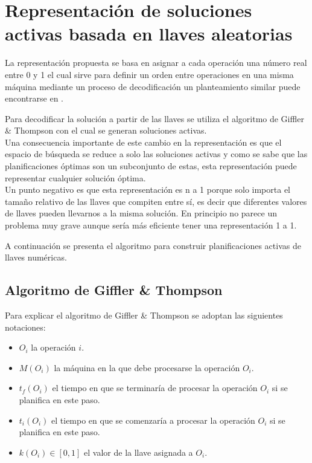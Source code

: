 \section{Representación de soluciones activas basada en llaves aleatorias}
La representación propuesta se basa en asignar a cada operación una número real entre 0 y 1 el cual sirve para definir un orden entre operaciones en una misma máquina mediante un proceso de decodificación un planteamiento similar puede encontrarse en \cite{bean1994genetic,norman1996random,Ponsich2013}.

Para decodificar la solución a partir de las llaves se utiliza el algoritmo de Giffler \& Thompson \cite{Giffler1960} con el cual se generan soluciones activas.\\ 

Una consecuencia importante de este cambio en la representación es que el espacio de búsqueda se reduce a solo las soluciones activas y como se sabe que las planificaciones óptimas son un subconjunto de estas, esta representación puede representar cualquier solución óptima. 
\\

Un punto negativo es que esta representación es n a 1 porque solo importa el tamaño relativo de las llaves que compiten entre sí, es decir que diferentes valores de llaves pueden llevarnos a la misma solución. En principio no parece un problema muy grave aunque sería más eficiente tener una representación 1 a 1.

A continuación se presenta el algoritmo para construir planificaciones activas de llaves numéricas.

\subsection{Algoritmo de Giffler \& Thompson}
Para explicar el algoritmo de Giffler \& Thompson se adoptan las siguientes notaciones:
\begin{itemize}
    \item $O_i$ la operación $i$.
    \item $M(O_i)$ la máquina en la que debe procesarse la operación $O_i$.
    \item $t_f(O_i)$ el tiempo en que se terminaría de procesar la operación $O_i$ si se planifica en este paso.
    \item $t_i(O_i)$ el tiempo en que se comenzaría a procesar la operación $O_i$ si se planifica en este paso.
    \item $k(O_i)\in [0,1]$ el valor de la llave asignada a $O_i$.
\end{itemize}

